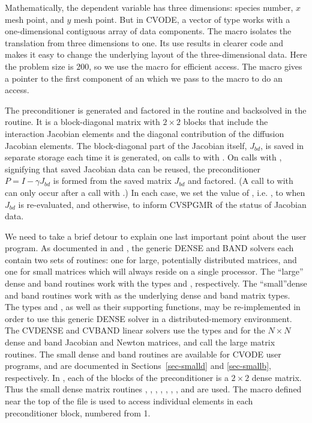 Mathematically, the dependent variable has three dimensions: species
number, $x$ mesh point, and $y$ mesh point.  But in CVODE, a vector of
type  works with a one-dimensional contiguous array of
data components. The macro  isolates the translation from
three dimensions to one. Its use results in clearer code and makes it
easy to change the underlying layout of the three-dimensional
data. Here the problem size is $200$, so we use the 
macro for efficient  access.  The  macro
gives a pointer to the first component of an  which we
pass to the  macro to do an  access.

The preconditioner is generated and factored in the 
routine and backsolved in the  routine.  
It is a block-diagonal matrix with $2 \times 2$ blocks that include the
interaction Jacobian elements and the diagonal contribution of the
diffusion Jacobian elements.  The block-diagonal part of the Jacobian
itself, $J_{bd}$, is saved in separate storage each time it is
generated, on calls to  with .
On calls with , signifying that saved Jacobian data
can be reused, the preconditioner $P = I - \gamma J_{bd}$ is formed from the
saved matrix $J_{bd}$ and factored.  (A call to  with
 can only occur after a call with
.) In each case, we set the value of , i.e.
, to  when $J_{bd}$ is re-evaluated,
and  otherwise, to inform CVSPGMR of the status of Jacobian data.

We need to take a brief detour to explain one last important point about
the  user program. As documented in  and ,
the generic DENSE and BAND solvers each contain two sets of routines: one
for large, potentially distributed matrices, and one for small matrices which
will always reside on a single processor. The ``large'' dense and band
routines work with the types  and , respectively.
The ``small''dense and band routines work with  as the
underlying dense and band matrix types. The types  and 
, as well as their supporting functions, may be re-implemented
in order to use this generic DENSE solver in a distributed-memory
environment. The CVDENSE and CVBAND linear solvers use the types
 and  for the $N \times N$ dense and band
Jacobian and Newton matrices, and call the large matrix routines. 
The small dense and band routines are available for CVODE user
programs, and are documented in Sections~\ref{sec-smalld} and 
\ref{sec-smallb}, respectively.
In , each of the blocks of the preconditioner is a 
$2 \times 2$ dense matrix. Thus the small dense matrix routines
, , , , , 
, , and  are
used.
The macro  defined near
the top of the file is used to access individual elements in each preconditioner 
block, numbered from 1.

